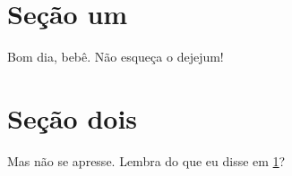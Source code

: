 \documentclass{article}
\begin{document}
\section{Seção um}\label{s:um}
Bom dia, bebê. Não esqueça o dejejum!

\section{Seção dois}
Mas não se apresse. Lembra do que eu disse em \ref{s:um}?
\end{document}
